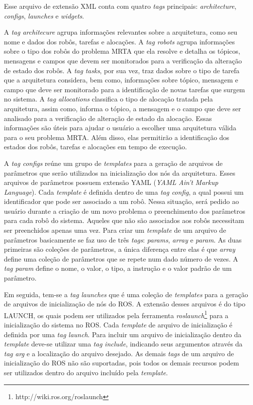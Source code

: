             Esse arquivo de extensão XML conta com quatro \textit{tags} principais: \textit{architecture}, \textit{configs}, \textit{launches} e \textit{widgets}. 
            
            A \textit{tag architecure} agrupa informações relevantes sobre a arquitetura, como seu nome e dados dos robôs, tarefas e alocações. A \textit{tag robots} agrupa informações sobre o tipo dos robôs do problema MRTA que ela resolve e detalha os tópicos, mensagens e campos que devem ser monitorados para a verificação da alteração de estado dos robôs. A \textit{tag tasks}, por sua vez, traz dados sobre o tipo de tarefa que a arquitetura considera, bem como, informações sobre tópico, mensagem e campo que deve ser monitorado para a identificação de novas tarefas que surgem no sistema. A \textit{tag allocations} classifica o tipo de alocação tratada pela arquitetura, assim como, informa o tópico, a mensagem e o campo que deve ser analisado para a verificação de alteração de estado da alocação. Essas informações são úteis para ajudar o usuário a escolher uma arquitetura válida para o seu problema MRTA. Além disso, elas permitirão a identificação dos estados dos robôs, tarefas e alocações em tempo de execução.
            
            A \textit{tag configs} reúne um grupo de \textit{templates} para a geração de arquivos de parâmetros que serão utilizados na inicialização dos nós da arquitetura. Esses arquivos de parâmetros possuem extensão YAML (\textit{YAML Ain't Markup Language}). Cada \textit{template} é definida dentro de uma \textit{tag config}, a qual possui um identificador que pode ser associado a um robô. Nessa situação, será pedido ao usuário durante a criação de um novo problema o preenchimento dos parâmetros para cada robô do sistema. Aqueles que não são associados aos robôs necessitam ser preenchidos apenas uma vez. Para criar um \textit{template} de um arquivo de parâmetros basicamente se faz uso de três \textit{tags}: \textit{params}, \textit{array} e \textit{param}. As duas primeiras são coleções de parâmetros, a única diferença entre elas é que \textit{array} define uma coleção de parâmetros que se repete num dado número de vezes. A \textit{tag param} define o nome, o valor, o tipo, a instrução e o valor padrão de um parâmetro.
            
            Em seguida, tem-se a \textit{tag launches} que é uma coleção de \textit{templates} para a geração de arquivos de inicialização de nós do ROS. A extensão desses arquivos é do tipo LAUNCH, os quais podem ser utilizados pela ferramenta \textit{roslaunch}\footnote{http://wiki.ros.org/roslaunch} para a inicialização do sistema no ROS. Cada \textit{template} de arquivo de inicialização é definida por uma \textit{tag launch}. Para incluir um arquivo de inicialização dentro da \textit{template} deve-se utilizar uma \textit{tag include}, indicando seus argumentos através da \textit{tag arg} e a localização do arquivo desejado. As demais \textit{tags} de um arquivo de inicialização do ROS não são suportadas, pois todos os demais recursos podem ser utilizados dentro do arquivo incluído pela \textit{template}.
            
